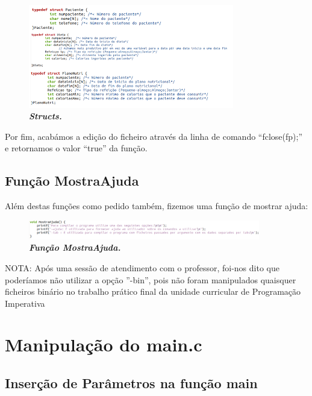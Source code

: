 \documentclass[a4wide]{report}
\begin{document}
\begin{figure}[hbt]
    \centering
    \includegraphics[width=0.80\textwidth]{structs.png}
    \caption{\textbf{\textit{Structs.}}\label{fig:imagem}}
\end{figure}

Por fim, acabámos a edição do ficheiro através da linha de comando “fclose(fp);” e retornamos o valor “true” da função. 

\subsection{Função MostraAjuda}
\Large
Além destas funções como pedido também, fizemos uma função de mostrar ajuda: 

\begin{figure}[hbt]
    \centering
    \includegraphics[width=0.90\textwidth]{mostraajuda.png}
    \caption{\textbf{\textit{Função MostraAjuda.}}\label{fig:imagem}}
\end{figure}

NOTA: Após uma sessão de atendimento com o professor, foi-nos dito que poderíamos não utilizar a opção ”-bin”, pois não foram manipulados quaisquer ficheiros binário no trabalho prático final da unidade curricular de Programação Imperativa

\section{Manipulação do main.c}

\subsection{Inserção de Parâmetros na função main}
\end{document}
